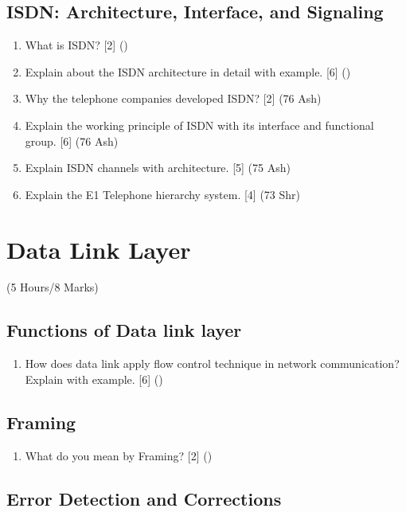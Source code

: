 \documentclass[12pt]{article}
\begin{document}
\subsection{ISDN: Architecture, Interface, and Signaling}
\begin{enumerate}[noitemsep, topsep=0pt]
	\item What is ISDN? \hfill [2] ()
	
	\item Explain about the ISDN architecture in detail with example. \hfill [6] ()
	
	\item Why the telephone companies developed ISDN? \hfill [2] (76 Ash)
	
	\item Explain the working principle of ISDN with its interface and functional group. \hfill [6] (76 Ash)
	
	\item Explain ISDN channels with architecture. \hfill [5] (75 Ash)
	
	\item Explain the E1 Telephone hierarchy system. \hfill [4] (73 Shr)
\end{enumerate}

\pagebreak
\section{Data Link Layer}
\begin{center}(5 Hours/8 Marks)\end{center}
\subsection{Functions of Data link layer}
\begin{enumerate}[noitemsep, topsep=0pt]
	\item How does data link apply flow control technique in network communication? Explain with example. \hfill [6] ()
\end{enumerate}
\subsection{Framing}
\begin{enumerate}[noitemsep, topsep=0pt]
	\item What do you mean by Framing? \hfill [2] ()
\end{enumerate}
\subsection{Error Detection and Corrections}
\end{document}
